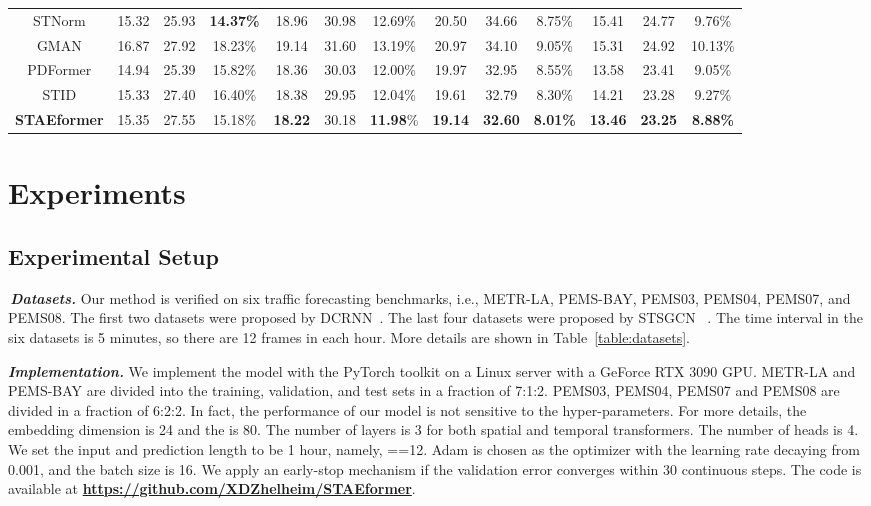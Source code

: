 \documentclass[sigconf]{acmart}
\begin{document}
\begin{table}[t]
{\begin{tabular}{c|ccc|ccc|ccc|ccc}
STNorm    & 15.32 &25.93 & \textbf{14.37\%}                   & 18.96          & 30.98          & 12.69\%          & 20.50          & 34.66          & 8.75\%          & 15.41          & 24.77          & 9.76\%          \\
GMAN  & 16.87 & 27.92 & 18.23\%                       & 19.14          & 31.60          & 13.19\%          & 20.97          & 34.10          & 9.05\%          & 15.31          & 24.92          & 10.13\%         \\
PDFormer & 14.94 & 25.39 & 15.82\% & 18.36          & 30.03          & 12.00\% & 19.97          & 32.95          & 8.55\%          & 13.58          & 23.41          & 9.05\%          \\
STID    &  15.33 & 27.40 & 16.40\%                  & 18.38          & 29.95 & 12.04\%          & 19.61          & 32.79          & 8.30\%          & 14.21          & 23.28          & 9.27\%          \\
\textbf{STAEformer}   & 15.35 & 27.55 & 15.18\%            & \textbf{18.22} & 30.18          & \textbf{11.98}\%          & \textbf{19.14} & \textbf{32.60} & \textbf{8.01\%} & \textbf{13.46} & \textbf{23.25} & \textbf{8.88\%} \\ \hline\hline
\end{tabular}
}
\label{table:040708}
\end{table}

\section{Experiments}
\subsection{Experimental Setup}

\quad\,\textit{\textbf{Datasets.}} Our method is verified on six traffic forecasting benchmarks, i.e., METR-LA, PEMS-BAY, PEMS03, PEMS04, PEMS07, and PEMS08. The first two datasets were proposed by DCRNN~\cite{DCRNN}. The last four datasets were proposed by STSGCN ~\cite{STSGCN}. The time interval in the six datasets is 5 minutes, so there are 12 frames in each hour. More details are shown in Table~\ref{table:datasets}.


\textit{\textbf{Implementation.}} We implement the model with the PyTorch toolkit on a Linux server with a GeForce RTX 3090 GPU. METR-LA and PEMS-BAY are divided into the training, validation, and test sets in a fraction of 7:1:2. PEMS03, PEMS04, PEMS07 and PEMS08 are divided in a fraction of 6:2:2. In fact, the performance of our model is not sensitive to the hyper-parameters. For more details, the embedding dimension  is 24 and the  is 80. The number of layers  is 3 for both spatial and temporal transformers. The number of heads is 4. We set the input and prediction length to be 1 hour, namely, ==12. Adam is chosen as the optimizer with the learning rate decaying from 0.001, and the batch size is 16. We apply an early-stop mechanism if the validation error converges within 30 continuous steps. The code is available at \textbf{\url{https://github.com/XDZhelheim/STAEformer}}.
\end{document}
